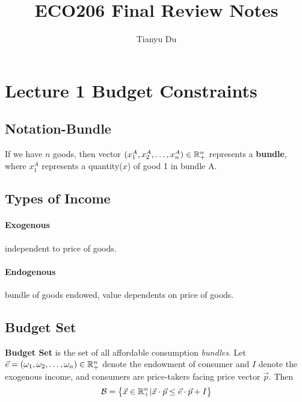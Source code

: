 \documentclass[]{article}
\title{ECO206 Final Review Notes}
\author{Tianyu Du}
\begin{document}
    \maketitle
    \tableofcontents

    \section{Lecture 1 Budget Constraints}
    
        \subsection{Notation-Bundle}
            \begin{definition}
                If we have $n$ goods, then vector $(x_1^A, x_2^A, \dots, x_n^A) \in \mathbb{R}^n_+$ represents a \textbf{bundle}, where $x_1^A$ represents a quantity($x$) of good 1 in bundle A. 
            \end{definition}
            
        \subsection{Types of Income}
            \paragraph{Exogenous}independent to price of goods.
            \paragraph{Endogenous}bundle of goods endowed, value dependents on price of goods.
            
        \subsection{Budget Set}
            \begin{definition}
                \textbf{Budget Set} is the set of all affordable consumption \emph{bundles}. Let $\vec{e}=(\omega_1,\omega_2,\dots,\omega_n) \in \mathbb{R}^n_+$ denote the endowment of consumer and $I$ denote the exogenous income, and consumers are price-takers facing price vector $\vec{p}$. Then
                \[
                    \mathcal{B} = \big\{\vec{x}\in \mathbb{R}^n_+ \vert \vec{x}\cdot\vec{p} \leq \vec{e}\cdot\vec{p} + I  \big\}
                \]
            \end{definition}
            
\end{document}
